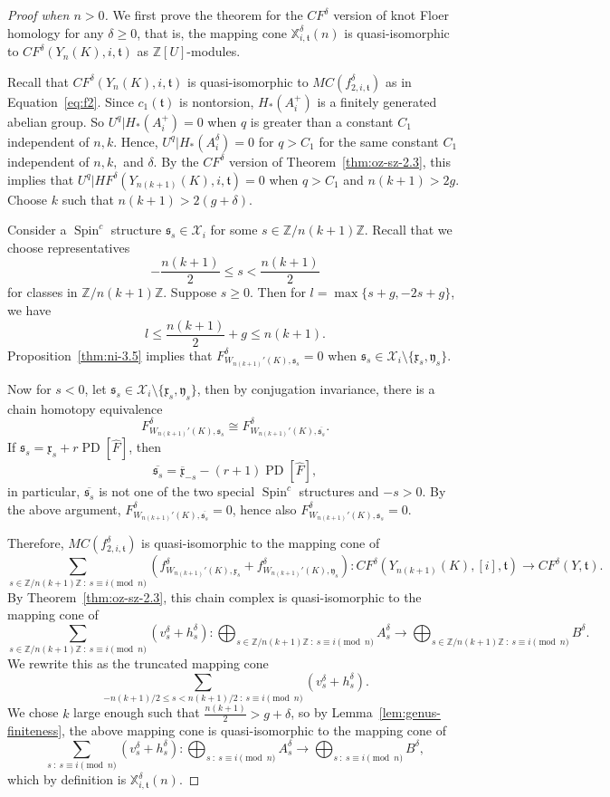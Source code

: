 \documentclass{article}
\theoremstyle{remark}
\numberwithin{equation}{section}
\numberwithin{table}{section}
\renewcommand{\frak}{\mathfrak}
\DeclareMathOperator{\Spin}{Spin}
\DeclareMathOperator{\PD}{PD}
\renewcommand{\(}{\left(}
\renewcommand{\)}{\right)}
\newcommand{\Z}{{\mathbb{Z}}}
\newcommand{\X}{{\mathbb{X}}}
\begin{document}
\begin{proof}[Proof when $n>0$]
We first prove the theorem for the $CF^\delta$ version of knot Floer homology for any $\delta\ge0$, that is, the mapping cone $\X_{i,\frak t}^\delta(n)$ is quasi-isomorphic to $CF^\delta(Y_n(K),i,\frak t)$ as $\Z[U]$-modules. 

Recall that $CF^\delta(Y_n(K),i,\frak t)$ is quasi-isomorphic to $MC(f_{2,i,\frak t}^\delta)$ as in Equation~\ref{eq:f2}. Since $c_1(\frak t)$ is nontorsion, $H_*(A_i^+)$ is a finitely generated abelian group. So $U^q\vert H_*(A_i^+)=0$ when $q$ is greater than a constant $C_1$ independent of $n,k$. Hence, $U^q\vert H_*(A_i^\delta)=0$ for $q>C_1$ for the same constant $C_1$ independent of $n,k,$ and $\delta$. By the $CF^\delta$ version of Theorem~\ref{thm:oz-sz-2.3}, this implies that $U^q\vert HF^\delta(Y_{n(k+1)}(K),i,\frak t)=0$ when $q>C_1$ and $n(k+1)>2g$. Choose $k$ such that $n(k+1)>2(g+\delta)$.

Consider a $\Spin^c$ structure $\frak s_s\in\mathcal X_i$ for some $s\in\Z/n(k+1)\Z$. Recall that we choose representatives
$$-\frac{n(k+1)}{2}\le s<\frac{n(k+1)}{2}$$ for classes in $\Z/n(k+1)\Z$. Suppose $s\ge 0$. Then for $l=\max\{s+g,-2s+g\}$, we have 
$$l\le \frac{n(k+1)}{2}+g\le n(k+1).$$ Proposition~\ref{thm:ni-3.5} implies that $F_{W_{n(k+1)}'(K),\frak s_s}^\delta=0$ when $\frak s_s\in\mathcal X_i\setminus\{\frak x_s,\frak y_s\}$. 

Now for $s<0$, let $\frak s_s\in\mathcal X_i\setminus\{\frak x_s,\frak y_s\}$, then by conjugation invariance, there is a chain homotopy equivalence
$$F_{W_{n(k+1)}'(K),\frak s_s}^\delta\cong F_{W_{n(k+1)}'(K),\overline{\frak s_s}}^\delta.$$ If $\frak s_s=\frak x_s+r\PD[\widehat F]$, then 
$$\overline{\frak s_s}=\overline{\frak x}_{-s}-(r+1)\PD[\widehat F],$$ in particular, $\overline{\frak s_s}$ is not one of the two special $\Spin^c$ structures and $-s>0$. By the above argument, $F_{W_{n(k+1)}'(K),\overline{\frak s_s}}^\delta=0$, hence also $F_{W_{n(k+1)}'(K),\frak s_s}^\delta=0$.

Therefore, $MC(f_{2,i,\frak t}^\delta)$ is quasi-isomorphic to the mapping cone of$$\sum_{s\in\Z/n(k+1)\Z\ :\ s\equiv i \pmod n}\left(f_{W_{n(k+1)}'(K),\frak x_s}^\delta+f_{W_{n(k+1)}'(K),\frak y_s}^\delta\right) : CF^\delta(Y_{n(k+1)}(K),[i],\frak t)\to CF^\delta(Y,\frak t).$$ By Theorem~\ref{thm:oz-sz-2.3}, this chain complex is quasi-isomorphic to the mapping cone of
$$\sum_{s\in\Z/n(k+1)\Z\ :\ s\equiv i \pmod n} (v_s^\delta + h_s^\delta): \bigoplus_{s\in\Z/n(k+1)\Z\ :\ s\equiv i \pmod n} A_s^\delta\to \bigoplus_{s\in\Z/n(k+1)\Z\ :\ s\equiv i \pmod n} B^\delta.$$ We rewrite this as the truncated mapping cone
$$\sum_{-n(k+1)/2\le s<n(k+1)/2\ :\ s\equiv i \pmod n} (v_s^\delta + h_s^\delta).$$ We chose $k$ large enough such that $\frac{n(k+1)}{2}>g+\delta$, so by Lemma~\ref{lem:genus-finiteness}, the above mapping cone is quasi-isomorphic to the mapping cone of
$$\sum_{s\ :\ s\equiv i \pmod n} (v_s^\delta + h_s^\delta): \bigoplus_{s\ :\ s\equiv i \pmod n} A_s^\delta\to \bigoplus_{s\ :\ s\equiv i \pmod n} B^\delta,$$ which by definition is $\X_{i,\frak t}^\delta(n)$.


\end{proof}
\end{document}
